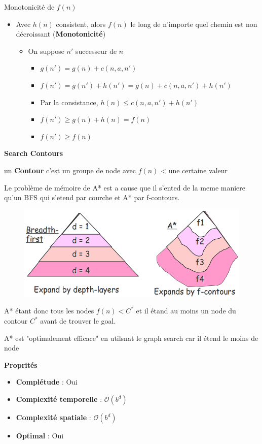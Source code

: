 			
		Monotonicité de $f(n)$
		\begin{itemize}
			\item Avec $h(n)$ consistent, alors $f(n)$ le long de n'importe quel  chemin est non décroissant (\textbf{Monotonicité})
			\begin{itemize}
				\item On suppose $n'$ successeur de $n$
				\begin{itemize}
					\item $g(n') = g(n) + c(n,a,n')$
					\item $f(n') = g(n') + h(n') = g(n) + c(n,a,n') + h(n')$
					\item Par la consistance, $h(n) \leq c(n,a,n') + h(n')$
					\item $f(n') \geq g(n) + h(n) = f(n)$
					\item $f(n') \geq f(n)$ 
				\end{itemize}
			\end{itemize}
		\end{itemize}
		
		\Large{\textbf{Search Contours}} \normalsize
		
	
			un \textbf{Contour} c'est un groupe de node avec $f(n)$ < une certaine valeur
			
			Le problème de mémoire de A* est a cause que il s'ented de la meme maniere qu'un BFS qui s'etend par courche et A* par f-contours.
			
			\begin{figure}[H]
				\centering
				\includegraphics[width=\textwidth]{img/MPA}
			\end{figure}			 
		
			A* étant donc tous les nodes $f(n) < C^*$ et il étand au moins un node du contour $C^*$ avant de trouver le goal.
		
			A* est "optimalement efficace" en utilsnat le graph search car il étend le moins de node
			
			\textbf{Proprités}
			\begin{itemize}
				\item \textbf{Complétude} : Oui
				\item \textbf{Complexité temporelle} : $\mathcal{O}(b^d)$
				\item \textbf{Complexité spatiale} : $\mathcal{O}(b^d)$
				\item \textbf{Optimal} : Oui
			\end{itemize}
			
